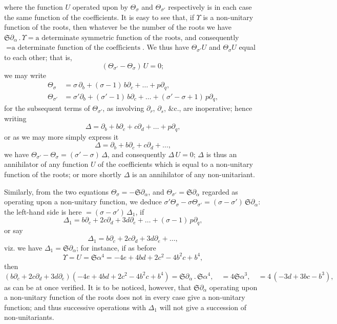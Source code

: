 \documentclass[11pt,a4paper]{book}
\begin{document}
\begin{art}
where the function $U$ operated upon by $\Theta_{\sigma}$ and $\Theta_{\sigma'}$ respectively is in each case the same function of the coefficients. It is easy to see that, if $\Upsilon$ is a non-unitary function of the roots, then whatever be the number of the roots we have $\mathfrak{S}\partial_{\alpha}\,.\,\Upsilon = \text{a determinate symmetric function of the roots}$, and consequently $= \text{a determinate function of the coefficients}$. We thus have $\Theta_{\sigma'} U$ and $\Theta_{\sigma} U$ equal to each other; that is,
\[
(\Theta_{\sigma'} - \Theta_{\sigma})\, U = 0;
\]
we may write
\begin{align*}
\Theta_{\sigma} &= \sigma\,\partial_{b} + (\sigma-1)\,b\partial_{c} + \ldots + p\partial_{q},\\
\Theta_{\sigma'} &= \sigma'\partial_{b} + (\sigma'-1)\,b\partial_{c} + \ldots + (\sigma'-\sigma+1)\,p\partial_{q},
\end{align*}
for the subsequent terms of $\Theta_{\sigma'}$, as involving $\partial_{r}$, $\partial_{s}$, \&c., are inoperative; hence writing
\[
\Delta = \partial_{b} + b\partial_{c} + c\partial_{d} + \ldots + p\partial_{q},
\]
or as we may more simply express it
\[
\Delta = \partial_{b} + b\partial_{c} + c\partial_{d} + \ldots,
\]
we have $\Theta_{\sigma'} - \Theta_{\sigma} = (\sigma' - \sigma)\,\Delta$, and consequently $\Delta\, U = 0$; $\Delta$ is thus an annihilator of any function $U$ of the coefficients which is equal to a non-unitary function of the roots; or more shortly $\Delta$ is an annihilator of any non-unitariant.
\end{art}

\setcounter{art}{22}
\begin{art}
Similarly, from the two equations $\Theta_{\sigma} = -\mathfrak{S}\partial_{\alpha}$, and $\Theta_{\sigma'} = \mathfrak{S}\partial_{\alpha}$ regarded as operating upon a non-unitary function, we deduce $\sigma'\Theta_{\sigma} - \sigma\Theta_{\sigma'} = (\sigma - \sigma')\,\mathfrak{S}\partial_{\alpha}$: the left-hand side is here $= (\sigma - \sigma')\,\Delta_{1}$, if
\[
\Delta_{1} = b\partial_{c} + 2c\partial_{d} + 3d\partial_{e} + \ldots + (\sigma-1)\,p\partial_{q},
\]
or say
\[
\Delta_{1} = b\partial_{c} + 2c\partial_{d} + 3d\partial_{e} + \ldots,
\]
viz. we have $\Delta_{1} = \mathfrak{S}\partial_{\alpha}$; for instance, if as before
\[
\Upsilon = U = \mathfrak{S}\alpha^{4} = -4e + 4bd + 2c^{2} - 4b^{2}c + b^{4},
\]
then
\[
(b\partial_{c} + 2c\partial_{d} + 3d\partial_{e})(-4e + 4bd + 2c^{2} - 4b^{2}c + b^{4}) = \mathfrak{S}\partial_{\alpha}\,.\,\mathfrak{S}\alpha^{4},\quad = 4\mathfrak{S}\alpha^{3},\quad = 4\,(-3d + 3bc - b^{3}),
\]
as can be at once verified. It is to be noticed, however, that $\mathfrak{S}\partial_{\alpha}$ operating upon a non-unitary function of the roots does not in every case give a non-unitary function; and thus successive operations with $\Delta_{1}$ will not give a succession of non-unitariants.
\end{art}
\end{document}
